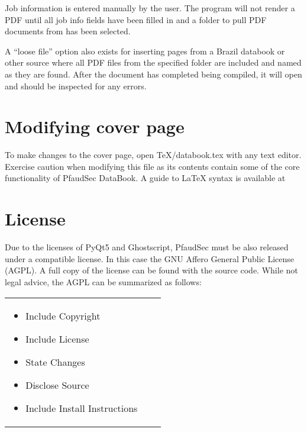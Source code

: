 \documentclass[14pt]{article}
\newcommand{\chref}[3][black]{\href{#2}{\color{#1}{#3}}}%
\begin{document}
\begin{flushleft}
\noindent Job information is entered manually by the user. The program will not render a PDF until all job info fields have been filled in and a folder to pull PDF documents from has been selected.

A ``loose file'' option also exists for inserting pages from a Brazil databook or other source where all PDF files from the specified folder are included and named as they are found.
After the document has completed being compiled, it will open and should be inspected for any errors.
\setlength{\parindent}{0in}

\section{Modifying cover page}

To make changes to the cover page, open TeX/databook.tex with any text editor.
Exercise caution when modifying this file as its contents contain some of the core functionality of PfaudSec DataBook.
A guide to \LaTeX\xspace syntax is available at 
\chref[pfblue]
{https://en.wikibooks.org/wiki/LaTeX/Basics}
{https://en.wikibooks.org/wiki/LaTeX/Basics}

\section{License}

Due to the licenses of PyQt5 and Ghostscript, PfaudSec must be also released under a compatible license.
In this case the GNU Affero General Public License (AGPL).
A full copy of the license can be found with the source code.
While not legal advice, the AGPL can be summarized as follows:\\[\normalbaselineskip]

\def\tabularxcolumn#1{m{#1}}%
\begin{tabularx}{\textwidth}{YYY}

\begin{tcolorbox}[
	equal height group=license, coltitle=black, title=\centering Must,
	boxrule=0.5pt, colback=backgrey, colframe=bordergrey, sharpish corners] 
\begin{itemize}[leftmargin=*]

\raggedright
\item Include Copyright
\item Include License
\item State Changes
\item Disclose Source
\item Include Install Instructions 


\end{itemize}
\end{tcolorbox}
\end{tabularx}
\end{flushleft}
\end{document}
